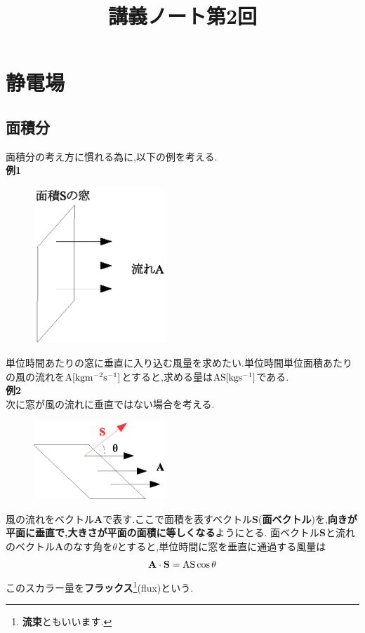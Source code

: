 \documentclass{jsarticle}
\title{講義ノート第2回}
\author{}
\date{}
\begin{document}
\maketitle

\section{静電場}

\setcounter{subsection}{3}

\subsection{面積分}
\noindent
面積分の考え方に慣れる為に,以下の例を考える.\\
{\bf 例1}\\
\begin{figure}[htbp]
 \begin{center}
  \includegraphics[width=50mm]{2.1.eps}
 \end{center}
 \caption{}
 \label{fig:one}
\end{figure}
\noindent
単位時間あたりの窓に垂直に入り込む風量を求めたい.単位時間単位面積あたりの風の流れを${\rm A[kgm^{-2}s^{-1}]}$とすると,求める量は${\rm AS[kgs^{-1}]}$である.\\
{\bf 例2}\\
次に窓が風の流れに垂直ではない場合を考える.
\begin{figure}[htbp]
 \begin{center}
  \includegraphics[width=50mm]{2.2.eps}
 \end{center}
 \caption{}
 \label{fig:one}
\end{figure}
風の流れをベクトル{\bf A}で表す.ここで面積を表すベクトル{\bf S}({\bf 面ベクトル})を,{\bf 向きが平面に垂直で,大きさが平面の面積に等しくなる}ようにとる.
面ベクトル{\bf S}と流れのベクトル{\bf A}のなす角を$\theta$とすると,単位時間に窓を垂直に通過する風量は
\begin{equation}
{\bf A}\cdot{\bf S}={\rm AS}\cos \theta
\end{equation}
このスカラー量を{\bf フラックス}\footnote{{\bf 流束}ともいいます.}(flux)という.\\
\end{document}
